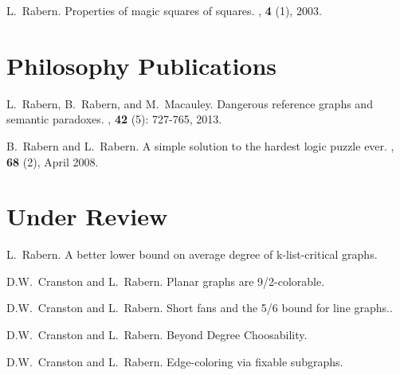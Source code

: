 \documentclass[margin,line]{res}
\begin{document}
\begin{resume}
\begin{enumerate}[{[}1{]}]
\smallskip

\item L.~Rabern.
\newblock Properties of magic squares of squares.
, \textbf{4}
  (1), 2003. 

\end{enumerate}

\section{\sc Philosophy Publications}
\begin{enumerate}[{[}1{]}]
	\setcounter{enumi}{29}
\item
L.~Rabern, B.~Rabern, and M.~Macauley.
\newblock Dangerous reference graphs and semantic paradoxes.
, \textbf{42} (5): 727-765, 2013.

\smallskip

\item
B.~Rabern and L.~Rabern.
\newblock A simple solution to the hardest logic puzzle ever. 
, \textbf{68} (2), April 2008.

\end{enumerate}
\section{\sc Under Review}

\begin{enumerate}[{[}1{]}]
\setcounter{enumi}{31}


\item
L.~Rabern.
\newblock A better lower bound on average degree of k-list-critical graphs.

\smallskip

\item
D.W.~Cranston and L.~Rabern.
\newblock Planar graphs are 9/2-colorable.

\smallskip

\item
D.W.~Cranston and L.~Rabern.
\newblock Short fans and the 5/6 bound for line graphs..

\smallskip

\item
D.W.~Cranston and L.~Rabern.
\newblock Beyond Degree Choosability.

\smallskip

\item
D.W.~Cranston and L.~Rabern.
\newblock Edge-coloring via fixable subgraphs.



\end{enumerate}
\end{resume}
\end{document}
